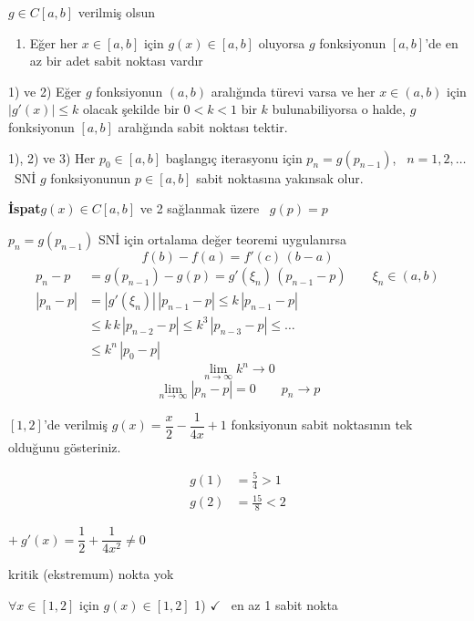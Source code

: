 \documentclass[11pt,a4paper]{article}
\begin{document}
\begin{teorem}
$g\in C[a,b]$ verilmiş olsun
\begin{enumerate}[label=\arabic*)]
  \item Eğer her $x\in[a,b]$ için $g(x)\in[a,b]$ oluyorsa $g$ fonksiyonun $[a,b]$'de en az bir adet
        sabit noktası vardır
\end{enumerate}
1) ve 2) Eğer $g$ fonksiyonun $(a,b)$ aralığında türevi varsa ve her $x\in(a,b)$ için
$|g'(x)|\le k$ olacak şekilde bir $0<k<1$ bir $k$ bulunabiliyorsa o halde, $g$ fonksiyonun $[a,b]$
aralığında sabit noktası tektir.
\end{teorem}

1), 2) ve 3) Her $p_0\in[a,b]$ başlangıç iterasyonu için $p_n=g(p_{n-1})$, \ $n=1,2,\dots$ \
SNİ $g$ fonksiyonunun $p\in[a,b]$ sabit noktasına yakınsak olur.

\textbf{İspat}\quad $g(x)\in C[a,b]$  ve 2 sağlanmak üzere \ $g(p)=p$

$p_n=g(p_{n-1})$ SNİ için ortalama değer teoremi uygulanırsa
\[ f(b)-f(a)=f'(c)\,(b-a) \]
\begin{align*}
  p_n-p&=g(p_{n-1})-g(p)=g'(\xi_n)\,(p_{n-1}-p) \qquad \xi_n\in(a,b)\\
  |p_n-p|&=|g'(\xi_n)|\,|p_{n-1}-p|\le k\,|p_{n-1}-p|\\
  &\le k\,k\,|p_{n-2}-p|\le k^3\,|p_{n-3}-p|\le\dots\\
  &\le k^n\,|p_0-p|
\end{align*}
\[ \lim_{n\to\infty}k^n\to 0 \]
\[ \lim_{n\to\infty}|p_n-p|=0 \qquad p_n\to p \]

\begin{ornek}[4]
$[1,2]$'de verilmiş $g(x)=\dfrac{x}{2}-\dfrac{1}{4x}+1$ fonksiyonun sabit noktasının tek olduğunu
gösteriniz.
\end{ornek}
\noindent\begin{minipage}[c]{0.4\linewidth}
\[
  \begin{aligned}
    g(1)&=\tfrac54>1\\
    g(2)&=\tfrac{15}{8}<2
  \end{aligned}
\]
\end{minipage}\hfill
\begin{minipage}[c]{0.58\linewidth}
$+\ g'(x)=\dfrac12+\dfrac{1}{4x^2}\neq 0$

kritik (ekstremum) nokta yok
\end{minipage}

\medskip
$\forall x\in[1,2]$ için $g(x)\in[1,2]$ \hfill 1) $\checkmark$ \ en az 1 sabit nokta
\end{document}
